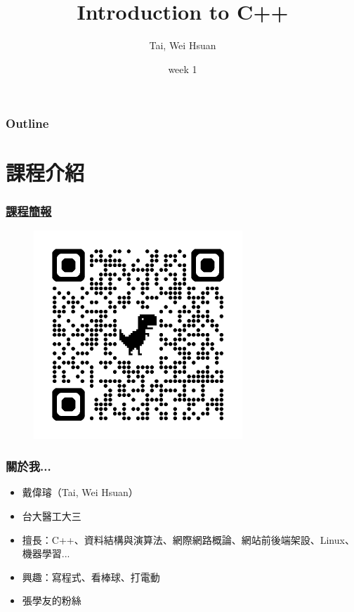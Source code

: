 \documentclass[xcolor=dvipsnames]{beamer}
\title{Introduction to C++}
\author{Tai, Wei Hsuan}
\date{week 1}
\begin{document}
	\begin{frame}
		\titlepage
	\end{frame}

    \begin{frame}
        \frametitle{Outline}
        \tableofcontents
    \end{frame}

    \section{課程介紹}

    \begin{frame}
        \frametitle{\href{https://drive.google.com/drive/folders/14Tkn-rddw0k1obeOxkWi00S43M0e9wlW?usp=sharing}{課程簡報}}
        \begin{figure}
            \centering
            \includegraphics[width=0.7\textwidth]{src/qrcode.png}
        \end{figure}
    \end{frame}

    \begin{frame}
        \frametitle{關於我...}
        \begin{itemize}
            \item 戴偉璿（Tai, Wei Hsuan）
            \item 台大醫工大三
            \item 擅長：C++、資料結構與演算法、網際網路概論、網站前後端架設、Linux、機器學習...
            \item 興趣：寫程式、看棒球、打電動
            \item 張學友的粉絲
        \end{itemize}
    \end{frame}
\end{document}
